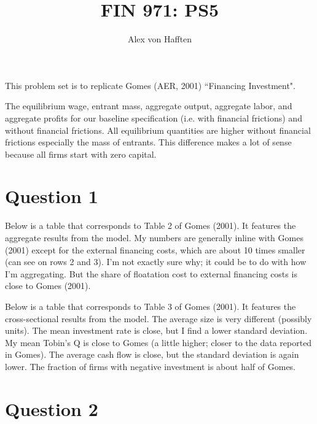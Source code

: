 \documentclass{article}
\title{FIN 971: PS5}
\author{Alex von Hafften}
\begin{document}
\maketitle

This problem set is to replicate Gomes (AER, 2001) ``Financing Investment".

\bigskip

The equilibrium wage, entrant mass, aggregate output, aggregate labor, and aggregate profits for our baseline specification (i.e. with financial frictions) and without financial frictions.  All equilibrium quantities are higher without financial frictions especially the mass of entrants.  This difference makes a lot of sense because all firms start with zero capital.

\bigskip


\section*{Question 1}

Below is a table that corresponds to Table 2 of Gomes (2001).  It features the aggregate results from the model. My numbers are generally inline with Gomes (2001) except for the external financing costs, which are about 10 times smaller (can see on rows 2 and 3).  I'm not exactly sure why; it could be to do  with how I'm aggregating.  But the share of floatation cost to external financing costs is close to Gomes (2001).

\bigskip


\bigskip

Below is a table that corresponds to Table 3 of Gomes (2001). It features the cross-sectional results from the model.  The average size is very different (possibly units).  The mean investment rate is close, but I find a lower standard deviation.  My mean Tobin's Q is close to Gomes (a little higher; closer to the data reported in Gomes).  The average cash flow is close, but the standard deviation is again lower.  The fraction of firms with negative investment is about half of Gomes.

\bigskip


\section*{Question 2}
\end{document}
